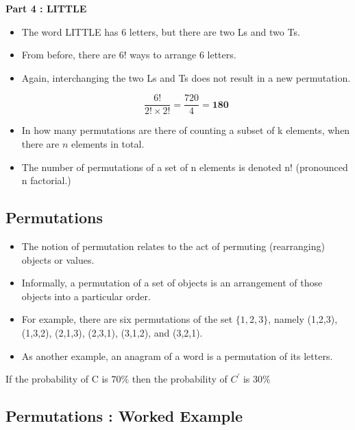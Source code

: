 \documentclass[]{report}
\begin{document}
\textbf{Part 4 : LITTLE}\\
\begin{itemize}
	\item The word LITTLE has 6 letters, but there are two Ls and two Ts.
	\item From before, there are 6! ways to arrange 6 letters.
	\item Again, interchanging the two Ls and Ts does not result in a new permutation. 
	
	\[\frac{6!}{2!\times 2!} =  \frac{720}{4} = \boldsymbol{180} \]
\end{itemize}

\begin{itemize}
	\item In how many permutations are there of counting a subset of k elements, when there are $n$ elements in total.
	
	\item The number of permutations of a set of n elements is denoted n! (pronounced n factorial.)
\end{itemize}

	\subsection{Permutations}
	
	\begin{itemize}
		\item The notion of permutation relates to the act of permuting (rearranging) objects or values. 
		\item Informally, a permutation of a set of objects is an arrangement of those objects into a particular order. 
		
		\item For example, there are six permutations of the set $\{1,2,3\}$, namely (1,2,3), (1,3,2), (2,1,3), (2,3,1), (3,1,2), and (3,2,1). 
		\item As another example, an anagram of a word is a permutation of its letters. 
		
	\end{itemize}
	
	If the probability of C is $70 \%$ then the probability of $C^{\prime}$ is $30\%$		
	

\subsection*{Permutations : Worked Example}
\end{document}
